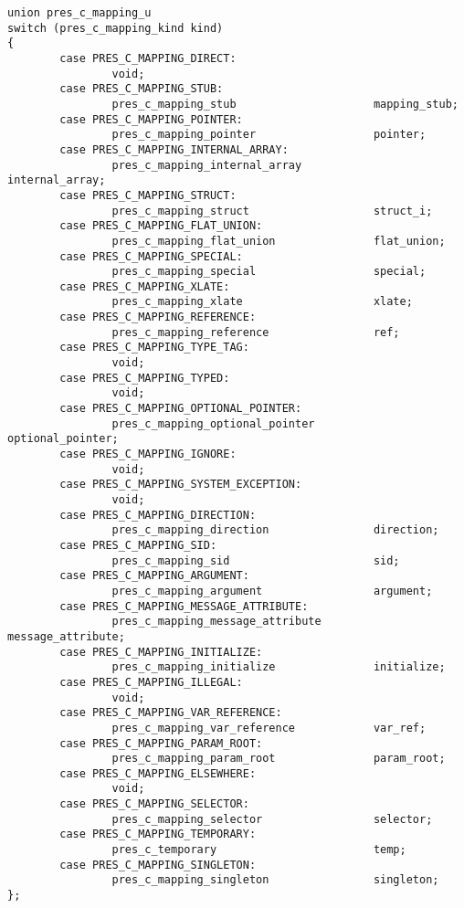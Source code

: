 \begin{verbatim}
union pres_c_mapping_u
switch (pres_c_mapping_kind kind)
{
        case PRES_C_MAPPING_DIRECT:
                void;
        case PRES_C_MAPPING_STUB:
                pres_c_mapping_stub                     mapping_stub;
        case PRES_C_MAPPING_POINTER:
                pres_c_mapping_pointer                  pointer;
        case PRES_C_MAPPING_INTERNAL_ARRAY:
                pres_c_mapping_internal_array           internal_array;
        case PRES_C_MAPPING_STRUCT:
                pres_c_mapping_struct                   struct_i;
        case PRES_C_MAPPING_FLAT_UNION:
                pres_c_mapping_flat_union               flat_union;
        case PRES_C_MAPPING_SPECIAL:
                pres_c_mapping_special                  special;
        case PRES_C_MAPPING_XLATE:
                pres_c_mapping_xlate                    xlate;
        case PRES_C_MAPPING_REFERENCE:
                pres_c_mapping_reference                ref;
        case PRES_C_MAPPING_TYPE_TAG:
                void;
        case PRES_C_MAPPING_TYPED:
                void;
        case PRES_C_MAPPING_OPTIONAL_POINTER:
                pres_c_mapping_optional_pointer         optional_pointer;
        case PRES_C_MAPPING_IGNORE:
                void;
        case PRES_C_MAPPING_SYSTEM_EXCEPTION:
                void;
        case PRES_C_MAPPING_DIRECTION:
                pres_c_mapping_direction                direction;
        case PRES_C_MAPPING_SID:
                pres_c_mapping_sid                      sid;
        case PRES_C_MAPPING_ARGUMENT:
                pres_c_mapping_argument                 argument;
        case PRES_C_MAPPING_MESSAGE_ATTRIBUTE:
                pres_c_mapping_message_attribute        message_attribute;
        case PRES_C_MAPPING_INITIALIZE:
                pres_c_mapping_initialize               initialize;
        case PRES_C_MAPPING_ILLEGAL:
                void;
        case PRES_C_MAPPING_VAR_REFERENCE:      
                pres_c_mapping_var_reference            var_ref;
        case PRES_C_MAPPING_PARAM_ROOT:
                pres_c_mapping_param_root               param_root;
        case PRES_C_MAPPING_ELSEWHERE:
                void;
        case PRES_C_MAPPING_SELECTOR:
                pres_c_mapping_selector                 selector;
        case PRES_C_MAPPING_TEMPORARY:
                pres_c_temporary                        temp;
        case PRES_C_MAPPING_SINGLETON:
                pres_c_mapping_singleton                singleton;
};
\end{verbatim}

